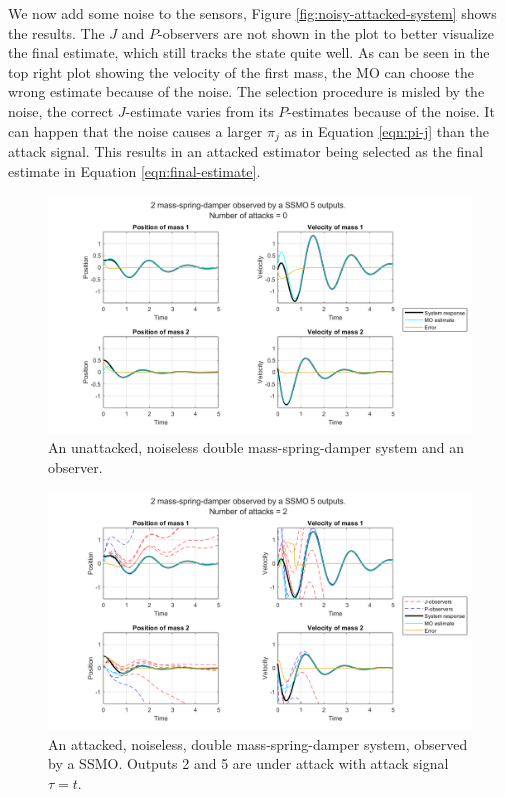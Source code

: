 We now add some noise to the sensors, Figure \ref{fig:noisy-attacked-system} shows the results. The $J$ and $P$-observers are not shown in the plot to better visualize the final estimate, which still tracks the state quite well. As can be seen in the top right plot showing the velocity of the first mass, the MO can choose the wrong estimate because of the noise. The selection procedure is misled by the noise, the correct $J$-estimate varies from its $P$-estimates because of the noise. It can happen that the noise causes a larger $\pi_j$ as in Equation \eqref{eqn:pi-j} than the attack signal. This results in an attacked estimator being selected as the final estimate in Equation \eqref{eqn:final-estimate}.\\

\begin{figure}[H]
    \centering
    \includegraphics[width=\linewidth]{report/Figures/symplot_5o0a.png}
    \caption{An unattacked, noiseless double mass-spring-damper system and an observer.}
    \label{fig:unattacked-system-plot}
\end{figure}

\begin{figure}[H]
    \centering
    \includegraphics[width=\linewidth]{report/Figures/symplot_5o2a}
    \caption{An attacked, noiseless, double mass-spring-damper system, observed by a SSMO. Outputs 2 and 5 are under attack with attack signal $\tau=t$.} 
    \label{fig:attacked-system-plot}
\end{figure}

